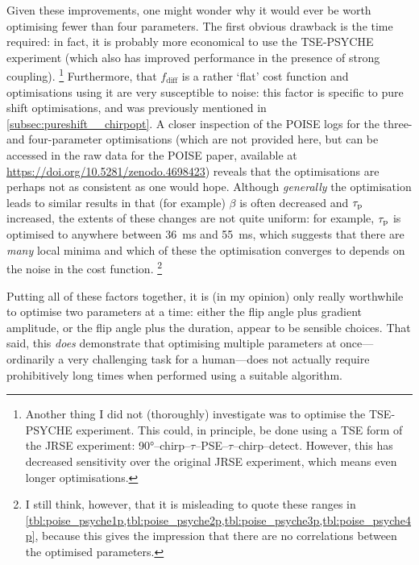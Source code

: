 Given these improvements, one might wonder why it would ever be worth optimising fewer than four parameters.
The first obvious drawback is the time required: in fact, it is probably more economical to use the TSE-PSYCHE experiment (which also has improved performance in the presence of strong coupling).%
\footnote{Another thing I did not (thoroughly) investigate was to optimise the TSE-PSYCHE experiment. This could, in principle, be done using a TSE form of the JRSE experiment: \ang{90}--chirp--$\tau$--PSE--$\tau$--chirp--detect. However, this has decreased sensitivity over the original JRSE experiment, which means even longer optimisations.}
Furthermore, that $f_\text{diff}$ is a rather `flat' cost function and optimisations using it are very susceptible to noise: this factor is specific to pure shift optimisations, and was previously mentioned in \cref{subsec:pureshift__chirpopt}.
A closer inspection of the POISE logs for the three- and four-parameter optimisations (which are not provided here, but can be accessed in the raw data for the POISE paper, available at \url{https://doi.org/10.5281/zenodo.4698423}) reveals that the optimisations are perhaps not as consistent as one would hope.
Although \textit{generally} the optimisation leads to similar results in that (for example) $\beta$ is often decreased and $\tau_\mathrm{p}$ increased, the extents of these changes are not quite uniform: for example, $\tau_\mathrm{p}$ is optimised to anywhere between \qty{36}{\ms} and \qty{55}{\ms}, which suggests that there are \textit{many} local minima and which of these the optimisation converges to depends on the noise in the cost function.%
\footnote{I still think, however, that it is misleading to quote these ranges in \cref{tbl:poise_psyche1p,tbl:poise_psyche2p,tbl:poise_psyche3p,tbl:poise_psyche4p}, because this gives the impression that there are no correlations between the optimised parameters.}

Putting all of these factors together, it is (in my opinion) only really worthwhile to optimise two parameters at a time: either the flip angle plus gradient amplitude, or the flip angle plus the duration, appear to be sensible choices.
That said, this \textit{does} demonstrate that optimising multiple parameters at once---ordinarily a very challenging task for a human---does not actually require prohibitively long times when performed using a suitable algorithm.
